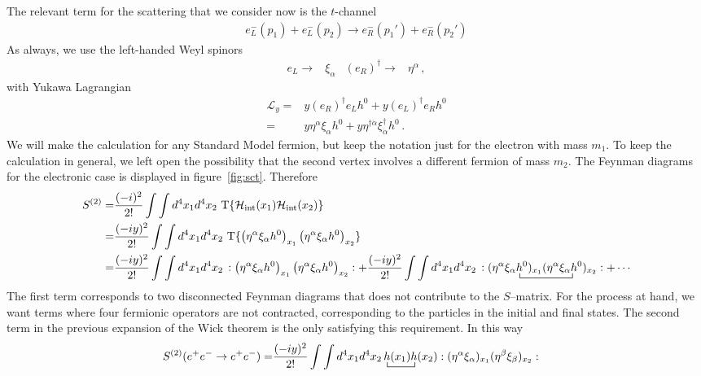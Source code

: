 The relevant term for the scattering that we consider now is the $t$-channel
\begin{align}
  e^{-}_L(p_1)+e_L^{-}(p_2)\to   e_R^{-}(p_1')+e_R^{-}(p_2')
\end{align}
As always, we use the left-handed Weyl spinors
\begin{align}
  e_L\to &\xi_{\alpha} &   \left( e_R \right)^{\dagger}\to &\eta^{\alpha}\,,
\end{align}
with Yukawa Lagrangian
\begin{align}
  \mathcal{L}_y=& y \left(e_R\right)^{\dagger} e_L h^0 +y \left(e_L\right)^{\dagger} e_R h^0 \nonumber\\
               =& y \eta^{\alpha} \xi_{\alpha}h^0 + y \eta^{\dagger\dot{\alpha}} \xi_{\dot{\alpha}}^{\dagger}h^0\,. 
\end{align}
We will make the calculation for any Standard Model fermion, but keep the notation just for the electron with mass $m_1$. To keep the calculation in general, we left open the possibility that the second vertex involves a different fermion of mass $m_2$. The Feynman diagrams for the electronic case is displayed in figure~\ref{fig:sct}. Therefore
\begin{align}
S^{(2)}=&  \frac{(-i)^2}{2!}\int\int d^4x_1 d^4x_2\,\operatorname{T}\{\mathcal{H}_{\text{int}}(x_1)\mathcal{H}_{\text{int}}(x_2)\}\nonumber\\
=&  \frac{(-iy)^2}{2!}\int\int d^4x_1 d^4x_2\,\operatorname{T}\{\left( \eta^{\alpha} \xi_{\alpha}h^0 \right)_{x_1} \left( \eta^{\alpha} \xi_{\alpha}h^0 \right)_{x_2}\}\nonumber\\
=& 
 \frac{(-iy)^2}{2!}\int\int d^4x_1 d^4x_2\,:\left( \eta^{\alpha} \xi_{\alpha}h^0 \right)_{x_1} \left( \eta^{\alpha} \xi_{\alpha}h^0 \right)_{x_2}:+
 \frac{(-iy)^2}{2!}\int\int d^4x_1 d^4x_2\,:( \eta^{\alpha} 
\bcontraction{\xi_{\alpha}}{\phi}{)_{x_1}(\eta^{\alpha} \xi_{\alpha}}{h^0}
\xi_{\alpha} h^0)_{x_1}(\eta^{\alpha} \xi_{\alpha}h^0 
)_{x_2}:+\cdots
\end{align}
The first term corresponds to two  disconnected Feynman diagrams that does not contribute to the $S$--matrix. For the process at hand, we want terms where four fermionic operators are not contracted, corresponding to the particles in the initial and final states. The second term in the previous expansion of the Wick theorem is the only satisfying this requirement. In this way
\begin{align}
  S^{(2)}(e^+ e^-\to e^+e^-)=&\frac{(-iy)^2}{2!}\int\int d^4x_1 d^4x_2
\bcontraction{\,}{h}{(x_1)}{h}
\,h(x_1)h(x_2):(\eta^{\alpha} \xi_{\alpha})_{x_1}(\eta^{\beta} \xi_{\beta})_{x_2}:
\end{align}

